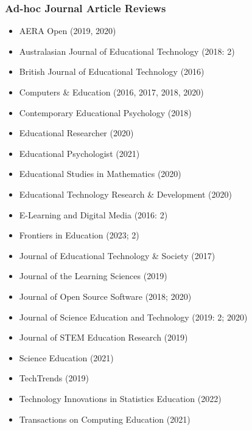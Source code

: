 \documentclass[
  14,
]{article}
\providecommand{\tightlist}{%
  \setlength{\itemsep}{0pt}\setlength{\parskip}{0pt}}
\begin{document}
\hypertarget{ad-hoc-journal-article-reviews}{%
\subsubsection{Ad-hoc Journal Article
Reviews}\label{ad-hoc-journal-article-reviews}}

\begin{itemize}
\tightlist
\item
  AERA Open (2019, 2020)\\
\item
  Australasian Journal of Educational Technology (2018: 2)\\
\item
  British Journal of Educational Technology (2016)\\
\item
  Computers \& Education (2016, 2017, 2018, 2020)\\
\item
  Contemporary Educational Psychology (2018)\\
\item
  Educational Researcher (2020)\\
\item
  Educational Psychologist (2021)\\
\item
  Educational Studies in Mathematics (2020)\\
\item
  Educational Technology Research \& Development (2020)\\
\item
  E-Learning and Digital Media (2016: 2)\\
\item
  Frontiers in Education (2023; 2)\\
\item
  Journal of Educational Technology \& Society (2017)\\
\item
  Journal of the Learning Sciences (2019)\\
\item
  Journal of Open Source Software (2018; 2020)\\
\item
  Journal of Science Education and Technology (2019: 2; 2020)\\
\item
  Journal of STEM Education Research (2019)\\
\item
  Science Education (2021)\\
\item
  TechTrends (2019)\\
\item
  Technology Innovations in Statistics Education (2022)\\
\item
  Transactions on Computing Education (2021)
\end{itemize}
\end{document}
